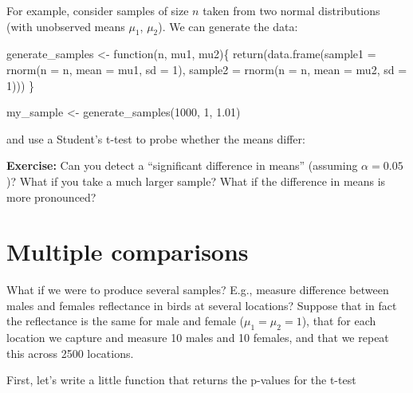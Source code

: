 \documentclass[
  letterpaper,
  DIV=11,
  numbers=noendperiod]{scrreprt}
\newenvironment{Shaded}{\begin{snugshade}}{\end{snugshade}}
\newcommand{\NormalTok}[1]{\textcolor[rgb]{0.00,0.23,0.31}{#1}}
\begin{document}
For example, consider samples of size \(n\) taken from two normal
distributions (with unobserved means \(\mu_1\), \(\mu_2\)). We can
generate the data:

\begin{Shaded}
\begin{Highlighting}[]
\NormalTok{generate\_samples \textless{}{-} function(n, mu1, mu2)\{}
\NormalTok{  return(data.frame(sample1 = rnorm(n = n, mean = mu1, sd = 1),}
\NormalTok{               sample2 = rnorm(n = n, mean = mu2, sd = 1)))}
\NormalTok{\}}

\NormalTok{my\_sample \textless{}{-} generate\_samples(1000, 1, 1.01)}
\end{Highlighting}
\end{Shaded}

and use a Student's t-test to probe whether the means differ:

\begin{Shaded}
\end{Shaded}

\textbf{Exercise:} Can you detect a ``significant difference in means''
(assuming \(\alpha = 0.05\))? What if you take a much larger sample?
What if the difference in means is more pronounced?

\section{Multiple comparisons}\label{multiple-comparisons}

What if we were to produce several samples? E.g., measure difference
between males and females reflectance in birds at several locations?
Suppose that in fact the reflectance is the same for male and female
(\(\mu_1 = \mu_2 = 1\)), that for each location we capture and measure
10 males and 10 females, and that we repeat this across 2500 locations.

First, let's write a little function that returns the p-values for the
t-test

\begin{Shaded}
\end{Shaded}
\end{document}
